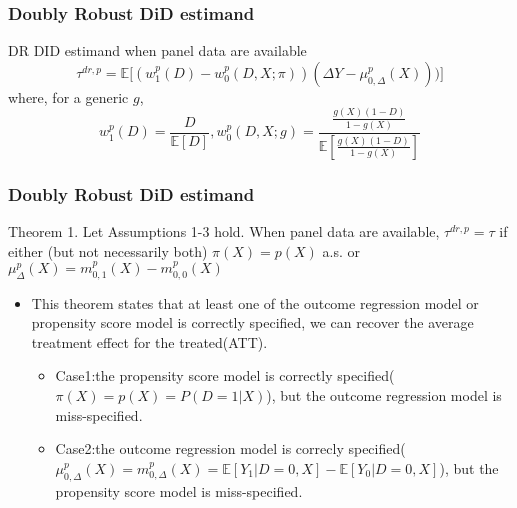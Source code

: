 \documentclass[fleqn]{beamer}
\begin{document}
\begin{frame}\frametitle{Doubly Robust DiD estimand}
    \begin{block}{DR DID estimand when panel data are available}
        \begin{equation*}
        \tau^{dr,p} = \mathbb{E}\lbrack (w^{p}_{1}(D)- w^{p}_{0}(D,X;\pi))(\Delta Y - \mu ^{p}_{0,\Delta}(X)))\rbrack
        \end{equation*}
        where, for a generic $g$,
        \begin{equation*}
            w^{p}_{1}(D) = \frac{D}{ \mathbb{E}[D]},w^{p}_{0}(D,X;g) = \frac{ \frac{g(X)(1-D)}{1-g(X)}}{ \mathbb{E}[\frac{g(X)(1-D)}{1-g(X)}]}
        \end{equation*}
    \end{block}
\end{frame}

\begin{frame}\frametitle{Doubly Robust DiD estimand}
    \begin{block}{Theorem 1.}
        Let Assumptions 1-3 hold. When panel data are available, $\tau ^{dr,p} = \tau$ if either (but not necessarily both) $\pi(X) = p(X)$ a.s. or $\mu ^{p}_{\Delta}(X) = m^{p}_{0,1}(X) - m^{p}_{0,0}(X)$
    \end{block}

    \begin{itemize}
        \item This theorem states that at least one of the outcome regression model or propensity score model is correctly specified, we can recover the average treatment effect for the treated(ATT).
        \begin{itemize}
            \item Case1:the propensity score model is correctly specified($\pi(X) = p(X) = P(D = 1|X)$), but the outcome regression model is miss-specified.
            \item Case2:the outcome regression model is correcly specified($\mu ^{p}_{0,\Delta}(X) = m^{p}_{0,\Delta}(X) = \mathbb{E}[Y_{1}|D = 0, X] - \mathbb{E}[Y_{0}|D = 0, X]$), but the propensity score model is miss-specified.
        \end{itemize}
    \end{itemize}

\end{frame}
\end{document}

